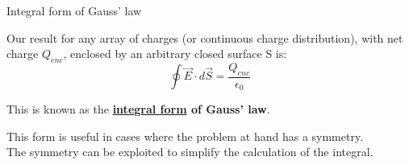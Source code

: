 %
%
%

\begin{frame}{Integral form of Gauss' law}

Our result for any array of charges (or continuous charge distribution), with net charge $Q_{enc}$,
enclosed by an arbitrary closed surface S is:
\begin{equation*}
  \oint \vec{E} \cdot d\vec{S} = \frac{Q_{enc}}{\epsilon_0}
\end{equation*}

This is known as the {\bf \underline{integral form} of Gauss' law}.\\
\vspace{0.2cm}

This form is useful in cases where the problem at hand has a symmetry.\\
The symmetry can be exploited to simplify the calculation of the integral.\\

\end{frame}



%
%

